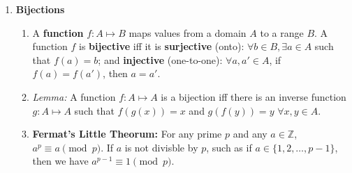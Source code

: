\documentclass[10pt]{article}
\begin{document}
\begin{multicols}{2}
\begin{enumerate}
    \item \textbf{Bijections}
    \begin{enumerate}
        \item A \textbf{function} $f: A \mapsto B$ maps values from a domain $A$ to a range $B$. A function $f$ is \textbf{bijective} iff it is \textbf{surjective} (onto): $\forall b \in B, \exists a \in A$ such that $f(a)=b$; and \textbf{injective} (one-to-one): $\forall a,a' \in A$, if $f(a)=f(a')$, then $a=a'$. 
        \item \textit{Lemma:} A function $f: A \mapsto A$ is a bijection iff there is an inverse function $g: A \mapsto A$ such that $f(g(x))=x$ and $g(f(y))=y$ $\forall x,y \in A$.
        \item \textbf{Fermat's Little Theorum:} For any prime $p$ and any $a \in \mathbb{Z}$, $a^p \equiv a \pmod{p}$. If $a$ is not divisble by $p$, such as if $a \in \{1,2,\hdots,p-1\}$, then we have $a^{p-1} \equiv 1 \pmod{p}$.
    \end{enumerate}
    

\end{enumerate}
\end{multicols}
\end{document}
